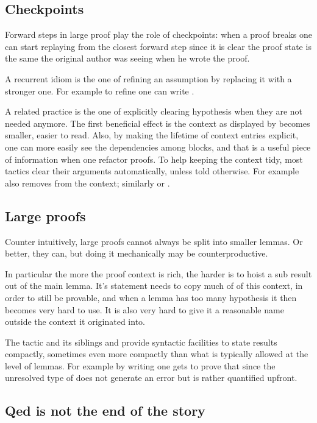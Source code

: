 \subsection{Checkpoints}

Forward steps in large proof play the role of checkpoints:
when a proof breaks one can start replaying from the closest
forward step since it is clear the proof state is the same
the original author was seeing when he wrote the proof.

A recurrent idiom is the one of refining an assumption by replacing
it with a stronger one. For example to refine  one
can write .

A related practice is the one of explicitly clearing hypothesis when
they are not needed anymore. The first beneficial effect is the
context
as displayed by \Coq{} becomes smaller, easier to read.
Also, by making the lifetime of context
entries explicit, one can more easily see the dependencies among
blocks, and that is a useful piece of information when one refactor
proofs.
To help keeping the context tidy, most
tactics clear their arguments automatically, unless told
otherwise. For example  also removes  from the
context; similarly  or .

\subsection{Large proofs}

Counter intuitively, large proofs cannot always be split into smaller
lemmas. Or better, they can, but doing it mechanically 
may be counterproductive.

In particular the more the proof context is rich, the harder is
to hoist a sub result out of the main lemma. It's statement needs to
copy much of of this context, in order to still be provable,
and when a lemma has too many hypothesis it then becomes very hard to
use. It is also very hard to give it a reasonable name outside the
context it originated into.

The  tactic and its siblings  and 
provide syntactic facilities to state results
compactly, sometimes even more compactly than what is typically allowed at the
level of lemmas. For example by writing  one
gets to prove that  since the unresolved
type of  does not generate an error but is rather quantified
upfront.

\subsection{Qed is not the end of the story}

